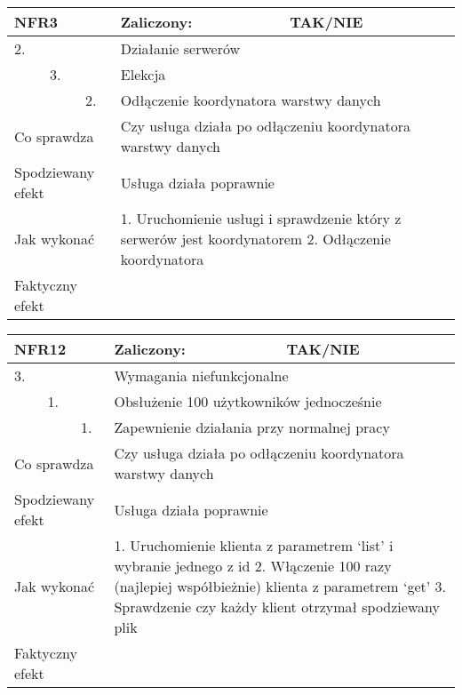 \begin{tabular}{|p{20pt}|p{20pt}|p{20pt}|p{250pt}|p{60pt}|}
	\hline
	\multicolumn{3}{|p{70pt}|}{NFR3} & Zaliczony: & TAK/NIE \\ \hline
	2. & & & \multicolumn{2}{|p{310pt}|}{Działanie serwerów } \\ \hline
	& 3. & & \multicolumn{2}{|p{310pt}|}{Elekcja } \\ \hline
	& & 2. & \multicolumn{2}{|p{310pt}|}{Odłączenie koordynatora warstwy danych } \\ \hline
	\multicolumn{3}{|p{70pt}|}{Co sprawdza} & \multicolumn{2}{|p{310pt}|}{Czy usługa działa po odłączeniu koordynatora warstwy danych} \\ \hline
	\multicolumn{3}{|p{70pt}|}{Spodziewany efekt} & \multicolumn{2}{|p{310pt}|}{Usługa działa poprawnie} \\ \hline
	\multicolumn{3}{|p{70pt}|}{Jak wykonać} & \multicolumn{2}{|p{310pt}|}{1. Uruchomienie usługi i sprawdzenie który z serwerów jest koordynatorem
2. Odłączenie koordynatora} \\ \hline
	\multicolumn{3}{|p{70pt}|}{Faktyczny efekt} & \multicolumn{2}{|p{310pt}|}{} \\ \hline
\end{tabular}

\begin{tabular}{|p{20pt}|p{20pt}|p{20pt}|p{250pt}|p{60pt}|}
	\hline
	\multicolumn{3}{|p{70pt}|}{NFR12} & Zaliczony: & TAK/NIE \\ \hline
	3. & & & \multicolumn{2}{|p{310pt}|}{Wymagania niefunkcjonalne } \\ \hline
	& 1. & & \multicolumn{2}{|p{310pt}|}{Obsłużenie 100 użytkowników jednocześnie } \\ \hline
	& & 1. & \multicolumn{2}{|p{310pt}|}{Zapewnienie działania przy normalnej pracy } \\ \hline
	\multicolumn{3}{|p{70pt}|}{Co sprawdza} & \multicolumn{2}{|p{310pt}|}{Czy usługa działa po odłączeniu koordynatora warstwy danych} \\ \hline
	\multicolumn{3}{|p{70pt}|}{Spodziewany efekt} & \multicolumn{2}{|p{310pt}|}{Usługa działa poprawnie} \\ \hline
	\multicolumn{3}{|p{70pt}|}{Jak wykonać} & \multicolumn{2}{|p{310pt}|}{1. Uruchomienie klienta z parametrem ‘list’ i wybranie jednego z id
2. Włączenie 100 razy (najlepiej współbieżnie) klienta z parametrem ‘get’
3. Sprawdzenie czy każdy klient otrzymał spodziewany plik} \\ \hline
	\multicolumn{3}{|p{70pt}|}{Faktyczny efekt} & \multicolumn{2}{|p{310pt}|}{} \\ \hline
\end{tabular}


